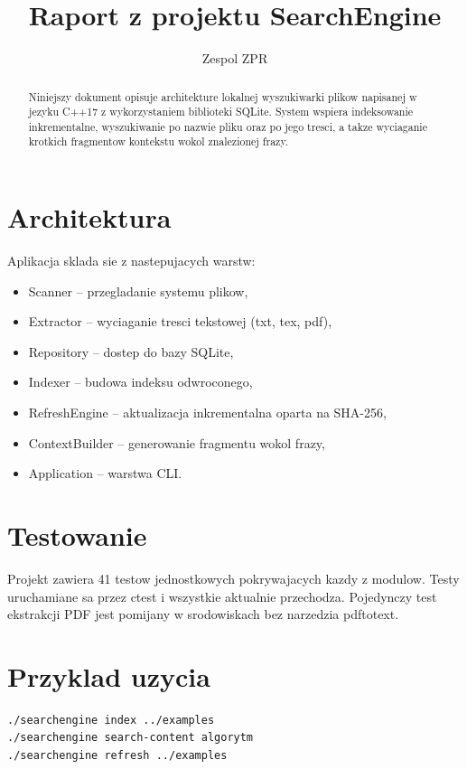 \documentclass{article}
\title{Raport z projektu SearchEngine}
\author{Zespol ZPR}
\begin{document}
\maketitle

\begin{abstract}
Niniejszy dokument opisuje architekture lokalnej wyszukiwarki plikow
napisanej w jezyku C++17 z wykorzystaniem biblioteki SQLite. System
wspiera indeksowanie inkrementalne, wyszukiwanie po nazwie pliku oraz
po jego tresci, a takze wyciaganie krotkich fragmentow kontekstu
wokol znalezionej frazy.
\end{abstract}

\section{Architektura}

Aplikacja sklada sie z nastepujacych warstw:

\begin{itemize}
  \item Scanner -- przegladanie systemu plikow,
  \item Extractor -- wyciaganie tresci tekstowej (txt, tex, pdf),
  \item Repository -- dostep do bazy SQLite,
  \item Indexer -- budowa indeksu odwroconego,
  \item RefreshEngine -- aktualizacja inkrementalna oparta na SHA-256,
  \item ContextBuilder -- generowanie fragmentu wokol frazy,
  \item Application -- warstwa CLI.
\end{itemize}

\section{Testowanie}

Projekt zawiera 41 testow jednostkowych pokrywajacych kazdy z modulow.
Testy uruchamiane sa przez ctest i wszystkie aktualnie przechodza.
Pojedynczy test ekstrakcji PDF jest pomijany w srodowiskach bez
narzedzia pdftotext.

\section{Przyklad uzycia}

\begin{verbatim}
./searchengine index ../examples
./searchengine search-content algorytm
./searchengine refresh ../examples
\end{verbatim}
\end{document}
